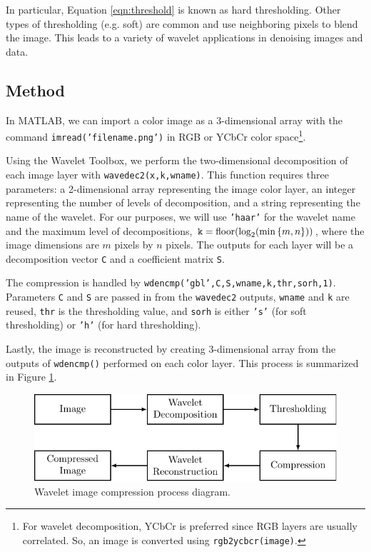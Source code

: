 \documentclass{article}
\DeclareMathOperator{\floor}{floor}
\theoremstyle{definition}
\begin{document}
  In particular, Equation \eqref{eqn:threshold} is known as hard thresholding. Other types of thresholding (e.g. soft) are common and use neighboring pixels to blend the image. This leads to a variety of wavelet applications in denoising images and data.

  \subsection{Method}
  In MATLAB, we can import a color image as a 3-dimensional array with the command \texttt{imread('filename.png')} in RGB or YCbCr color space\footnote{For wavelet decomposition, YCbCr is preferred since RGB layers are usually correlated. So, an image is converted using \texttt{rgb2ycbcr(image)}.}.
  
  Using the Wavelet Toolbox, we perform the two-dimensional decomposition of each image layer with \texttt{wavedec2(x,k,wname)}. This function requires three parameters: a 2-dimensional array representing the image color layer, an integer representing the number of levels of decomposition, and a string representing the name of the wavelet. For our purposes, we will use \texttt{'haar'} for the wavelet name and the maximum level of decompositions, \(\texttt{k} = \floor(\log_2(\min\qty{m,n}))\), where the image dimensions are \(m\) pixels by \(n\) pixels. The outputs for each layer will be a decomposition vector \texttt{C} and a coefficient matrix \texttt{S}.

  The compression is handled by \texttt{wdencmp('gbl',C,S,wname,k,thr,sorh,1)}. Parameters \texttt{C} and \texttt{S} are passed in from the \texttt{wavedec2} outputs, \texttt{wname} and \texttt{k} are reused, \texttt{thr} is the thresholding value, and \texttt{sorh} is either \texttt{'s'} (for soft thresholding) or \texttt{'h'} (for hard thresholding).

  Lastly, the image is reconstructed by creating 3-dimensional array from the outputs of \texttt{wdencmp()} performed on each color layer. This process is summarized in Figure \ref{fig:process-diagram}.

  \begin{figure}
    \centering
    \includegraphics{figs/fig-process.pdf}
    \caption{Wavelet image compression process diagram.}
    \label{fig:process-diagram}
  \end{figure}
\end{document}
